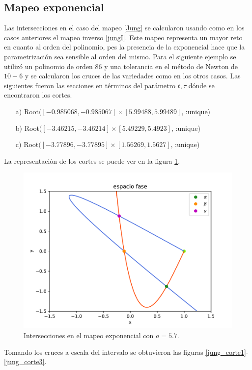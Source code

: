 \subsection{Mapeo exponencial}
Las intersecciones en el caso del mapeo \ref{Jung} se calcularon usando como en los casos anteriores el mapeo inverso \ref{jungI}. Este mapeo representa un mayor reto en cuanto al orden del polinomio, pes la presencia de la exponencial hace que la parametrización sea sensible al orden del mismo. Para el siguiente ejemplo se utilizó un polinomio de orden 86 y una tolerancia en el método de Newton de $10-6$ y se calcularon los cruces de las variedades como en los otros casos. Las siguientes fueron las secciones en términos del parámetro $t,\tau$ dónde se encontraron los cortes. 
\begin{itemize}
\item[a)] Root$([-0.985068, -0.985067] \times [5.99488, 5.99489]$, :unique)
\item[b)] Root$([-3.46215, -3.46214] \times [5.49229, 5.4923]$, :unique)
\item[c)] Root$([-3.77896, -3.77895] \times [1.56269, 1.5627]$, :unique)
\end{itemize}
La representación de los cortes se puede ver en la figura \ref{jung_cortes}.
\begin{figure}[H]
\centering
\includegraphics[scale=0.5]{cruces_jung1}
\caption{Intersecciones en el mapeo exponencial con $a=5.7$.}
\label{jung_cortes}
\end{figure}

Tomando los cruces a escala del intervalo se obtuvieron las figuras \ref{jung_corte1}-\ref{jung_corte3}.

